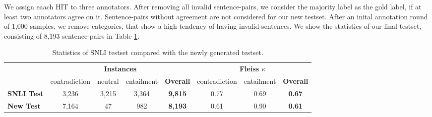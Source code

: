 \noindent
We assign eaach \ac{HIT} to three annotators. After removing all invalid sentence-pairs, we consider the majority label as the gold label, if at least two annotators agree on it. Sentence-pairs without agreement are not considered for our new testset. After an inital annotation round of 1,000 samples, we remove categories, that show a high tendency of having invalid sentences. We show the statistics of our final testset, consisting of 8,193 sentence-pairs in Table \ref{tab:newtest_stats}.
\begin{table}[tph!]
\centering
\begin{tabular}{l|cccc|ccc}
& \multicolumn{4}{c}{\textbf{Instances}} & \multicolumn{3}{c}{\textbf{Fleiss $\kappa$}} \\
& contradiction & neutral & entailment & \textbf{Overall} & contradiction & entailment & \textbf{Overall} \\
\toprule
\textbf{SNLI Test}& 3,236 & 3,215 & 3,364 & \textbf{9,815} & 0.77 & 0.69 & \textbf{0.67} \\
\textbf{New Test}& 7,164 & 47 & 982 & \textbf{8,193} & 0.61 & 0.90 & \textbf{0.61} \\
\bottomrule
\end{tabular}
	\caption{Statistics of \ac{SNLI} testset compared with the newly generated testset.}
	\label{tab:newtest_stats}
\end{table}
